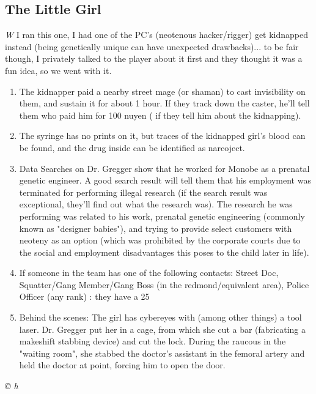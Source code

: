 \documentclass[letterpaper,onecolumn,10pt]{article}
\renewcommand{\textsc}[1]{{\fontspec{Friz Quadrata SC TT}\selectfont #1}}
\newcommand{\getyear}[1]{\StrLeft{#1}{4}}
\newenvironment{scenario}[6]
	{
		\section[#1 {\small\textsc{[#2]}}]{#1} \nopagebreak

		\noindent{\textsc{#2}}\nopagebreak

		\noindent\textit{#3}\nopagebreak
		\def\TMPSCENARIO{{\small\textit{©\getyear{#5}{} #4}}}
	}
	{\TMPSCENARIO}
\newcommand{\sectionlabel}[1]{\textbf{#1: }}
\newcommand{\notes}{\sectionlabel{Notes}}
\begin{document}
\begin{multicols}{2}
\begin{scenario}{The Little Girl}
\notes When I ran this one, I had one of the PC's (neotenous hacker/rigger) get kidnapped instead (being genetically unique can have unexpected drawbacks)... to be fair though, I privately talked to the player about it first and they thought it was a fun idea, so we went with it.

\begin{enumerate}

\item The kidnapper paid a nearby street mage (or shaman) to cast invisibility on them, and sustain it for about 1 hour. If they track down the caster, he'll tell them who paid him for 100 nuyen ( if they tell him about the kidnapping).

\item The syringe has no prints on it, but traces of the kidnapped girl's blood can be found, and the drug inside can be identified as narcoject.

\item Data Searches on Dr. Gregger show that he worked for Monobe as a prenatal genetic engineer. A good search result will tell them that his employment was terminated for performing illegal research (if the search result was exceptional, they'll find out what the research was). The research he was performing was related to his work, prenatal genetic engineering (commonly known as "designer babies"), and trying to provide select customers with neoteny as an option (which was prohibited by the corporate courts due to the social and employment disadvantages this poses to the child later in life).

\item If someone in the team has one of the following contacts: Street Doc, Squatter/Gang Member/Gang Boss (in the redmond/equivalent area), Police Officer (any rank) : they have a 25%

\item Behind the scenes: The girl has cybereyes with (among other things) a tool laser. Dr. Gregger put her in a cage, from which she cut a bar (fabricating a makeshift stabbing device) and cut the lock. During the raucous in the "waiting room", she stabbed the doctor's assistant in the femoral artery and held the doctor at point, forcing him to open the door.


\end{enumerate}
\end{scenario}
\end{multicols}
\end{document}

